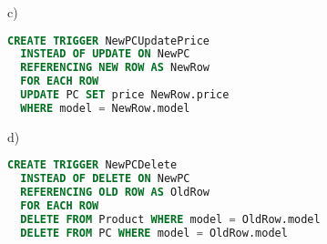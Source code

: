 \documentclass[../../main.tex]{subfiles}
\begin{document}
c)

\begin{lstlisting}[language=sql]
  CREATE TRIGGER NewPCUpdatePrice
  INSTEAD OF UPDATE ON NewPC
  REFERENCING NEW ROW AS NewRow
  FOR EACH ROW
  UPDATE PC SET price NewRow.price
  WHERE model = NewRow.model
\end{lstlisting}

d)

\begin{lstlisting}[language=sql]
  CREATE TRIGGER NewPCDelete
  INSTEAD OF DELETE ON NewPC
  REFERENCING OLD ROW AS OldRow
  FOR EACH ROW
  DELETE FROM Product WHERE model = OldRow.model
  DELETE FROM PC WHERE model = OldRow.model
\end{lstlisting}
\end{document}

